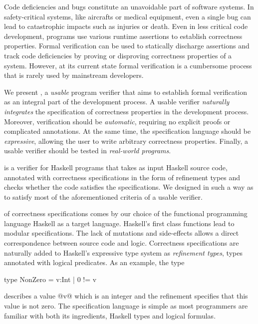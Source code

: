 Code deficiencies and bugs constitute an unavoidable part of software systems.
%
In safety-critical systems, like aircrafts or medical equipment, 
even a single bug can lead to catastrophic impacts
such as injuries or death.
%
Even in less critical code development, 
programs use various runtime assertions to establish correctness properties. 
%
Formal verification can be used to statically 
discharge assertions and 
track code deficiencies by proving or disproving correctness properties 
of a system. 
%
However, at its current state formal verification is a cumbersome process
that is rarely used by mainstream developers. 

We present \toolname, a \textit{usable} program verifier that aims to 
establish formal verification as an 
integral part of the development process.
%
A usable verifier \textit{naturally integrates}
the specification of correctness properties
in the development process. 
%
Moreover, verification should be \textit{automatic},
requiring no explicit proofs or complicated annotations. 
%
At the same time, the specification language should be \textit{expressive},
allowing the user to write arbitrary correctness properties. 
%
Finally, a usable verifier should be tested in \textit{real-world programs}. 

\href{http://goto.ucsd.edu/~rjhala/liquid/haskell/blog/about/}{\toolname} is a 
 verifier for Haskell programs
that takes as input Haskell source code, annotated with 
correctness specifications in the form of refinement types and checks whether the code satisfies the specifications. 
%
We designed \toolname in such a way as to satisfy most of the 
aforementioned criteria of a usable verifier.

 of correctness specifications 
comes by our choice of the functional programming language Haskell as a target language.
%
Haskell's first class functions lead to modular specifications. 
The lack of mutations and side-effects allows a direct correspondence between 
source code and logic. 
%
Correctness specifications are naturally added to Haskell's expressive type system
as \textit{refinement types}, \ie types annotated with logical predicates.
As an example, the type 
\begin{code}
  type NonZero = {v:Int | 0 != v}
\end{code}
describes a value @v@ which is an integer 
and the refinement specifies that this value is not zero.
%
The specification language is simple
as most programmers are familiar with both
its ingredients, \ie Haskell types and logical formulas.


